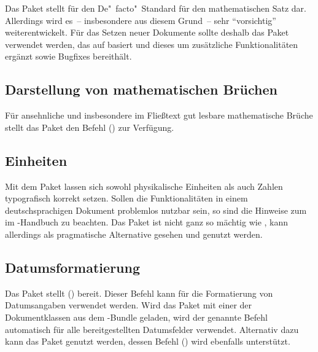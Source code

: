 \documentclass[%
  english,ngerman,%
  cdgeometry=no,DIV=12,automark%
]{tudscrartcl}
\begin{document}
Das Paket  stellt für  den De"~facto"~Standard 
für den mathematischen Satz dar. Allerdings wird es~-- insbesondere aus diesem 
Grund~-- sehr \enquote{vorsichtig} weiterentwickelt. Für das Setzen neuer 
Dokumente sollte deshalb das Paket  verwendet werden, das
auf  basiert und dieses um zusätzliche Funktionalitäten 
ergänzt sowie Bugfixes bereithält.


\subsection{Darstellung von mathematischen Brüchen}
Für ansehnliche und insbesondere im Fließtext gut lesbare mathematische Brüche 
stellt das Paket  den Befehl () zur 
Verfügung.
%
\begin{Preamble}
\usepackage{xfrac}

\end{Preamble}


\subsection{Einheiten}
Mit dem Paket  lassen sich sowohl physikalische Einheiten als 
auch Zahlen typografisch korrekt setzen. Sollen die Funktionalitäten in einem 
deutschsprachigen Dokument problemlos nutzbar sein, so sind die Hinweise zum 
 im 
\TUDScript-Handbuch zu beachten. Das Paket  ist nicht ganz so 
mächtig wie , kann allerdings als pragmatische Alternative 
gesehen und genutzt werden.


\subsection{Datumsformatierung}
Das Paket  stellt () bereit. 
Dieser Befehl kann für die Formatierung von Datumsangaben verwendet werden. 
Wird das Paket mit einer der Dokumentklassen aus dem \TUDScript-Bundle geladen, 
wird der genannte Befehl automatisch für alle bereitgestellten Datumsfelder 
verwendet. Alternativ dazu kann das Paket  genutzt werden, 
dessen Befehl () wird ebenfalls unterstützt.
%
\begin{Preamble}
\usepackage{isodate}

\end{Preamble}
\end{document}
